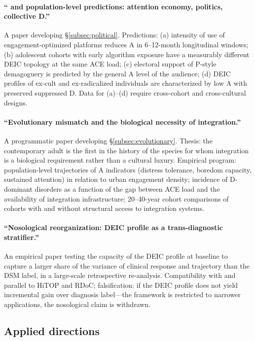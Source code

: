 \paragraph{``\DEIC{} and population-level predictions: attention economy, politics, collective D.''} A paper developing §\ref{subsec:political}. Predictions: (a) intensity of use of engagement-optimized platforms reduces A in 6--12-month longitudinal windows; (b) adolescent cohorts with early algorithm exposure have a measurably different DEIC topology at the same ACE load; (c) electoral support of P-style demagoguery is predicted by the general A level of the audience; (d) DEIC profiles of ex-cult and ex-radicalized individuals are characterized by low A with preserved suppressed D. Data for (a)--(d) require cross-cohort and cross-cultural designs.

\paragraph{``Evolutionary mismatch and the biological necessity of integration.''} A programmatic paper developing §\ref{subsec:evolutionary}. Thesis: the contemporary adult is the first in the history of the species for whom integration is a biological requirement rather than a cultural luxury. Empirical program: population-level trajectories of A indicators (distress tolerance, boredom capacity, sustained attention) in relation to urban engagement density; incidence of D-dominant disorders as a function of the gap between ACE load and the availability of integration infrastructure; 20--40-year cohort comparisons of cohorts with and without structural access to integration systems.

\paragraph{``Nosological reorganization: DEIC profile as a trans-diagnostic stratifier.''} An empirical paper testing the capacity of the DEIC profile at baseline to capture a larger share of the variance of clinical response and trajectory than the DSM label, in a large-scale retrospective re-analysis. Compatibility with and parallel to HiTOP and RDoC; falsification: if the DEIC profile does not yield incremental gain over diagnosis label---the framework is restricted to narrower applications, the nosological claim is withdrawn.

\subsection{Applied directions}

